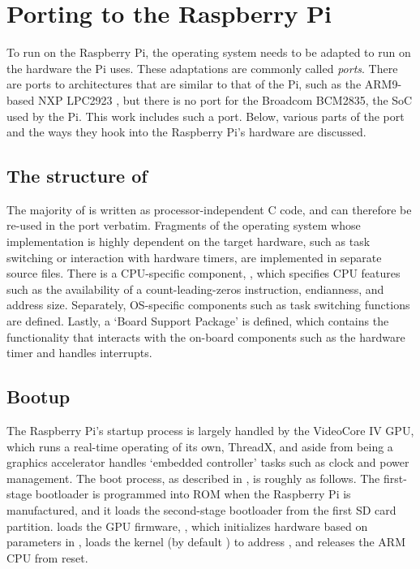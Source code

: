 \section{Porting \ucosiii to the Raspberry Pi}
To run \ucosiii on the Raspberry Pi, the operating system needs to be adapted to run on the hardware the Pi uses. These adaptations are commonly called \textit{ports}. There are ports to architectures that are similar to that of the Pi, such as the ARM9-based NXP LPC2923 \cite{micrium:nxplpc}, but there is no port for the Broadcom BCM2835, the SoC used by the Pi. This work includes such a port. Below, various parts of the port and the ways they hook into the Raspberry Pi's hardware are discussed.

\subsection{The structure of \ucosiii}
The majority of \ucosiii is written as processor-independent C code, and can therefore be re-used in the port verbatim. Fragments of the operating system whose implementation is highly dependent on the target hardware, such as task switching or interaction with hardware timers, are implemented in separate source files. There is a CPU-specific component, \ucpu, which specifies CPU features such as the availability of a count-leading-zeros instruction, endianness, and address size. Separately, OS-specific components such as task switching functions are defined. Lastly, a `Board Support Package' is defined, which contains the functionality that interacts with the on-board components such as the hardware timer and handles interrupts.

\subsection{Bootup}
The Raspberry Pi's startup process is largely handled by the VideoCore IV GPU, which runs a real-time operating of its own, ThreadX, and aside from being a graphics accelerator handles `embedded controller' tasks such as clock and power management. The boot process, as described in \textcite{rpi:bootforum}, is roughly as follows. The first-stage bootloader is programmed into ROM when the Raspberry Pi is manufactured, and it loads the second-stage bootloader  from the first SD card partition.  loads the GPU firmware, , which initializes hardware based on parameters in , loads the kernel (by default ) to address , and releases the ARM CPU from reset.

